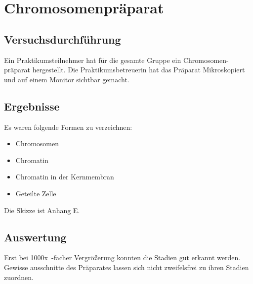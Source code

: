 \section{Chromosomenpräparat}
\label{sec:Chromos}

\subsection{Versuchsdurchführung}
\label{sec:Chromos-V}
Ein Praktikumsteilnehmer hat für die gesamte Gruppe ein Chromosomen-präparat hergestellt.
Die Praktikumsbetreuerin hat das Präparat Mikroskopiert und auf einem Monitor sichtbar gemacht.
\subsection{Ergebnisse}
\label{sec:Chromos-E}

Es waren folgende Formen zu verzeichnen:
\begin{itemize}
\item Chromosomen
\item Chromatin
\item Chromatin in der Kernmembran
\item Geteilte Zelle
\end{itemize}

Die Skizze ist Anhang E.

\subsection{Auswertung}
\label{sec:Chromos-A}
Erst bei 1000x~-facher Vergrößerung konnten die Stadien gut erkannt werden.
Gewisse ausschnitte des Präparates lassen sich nicht zweifelsfrei zu ihren Stadien zuordnen.

